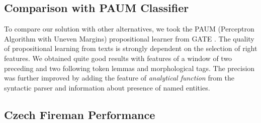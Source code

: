 \subsection{Comparison with PAUM Classifier}
To compare our solution with other alternatives, we took the PAUM (Perceptron Algorithm with Uneven Margins) propositional learner from GATE \citep{Li:Paum}. The quality of propositional learning from texts is strongly dependent on the selection of right features. We obtained quite good results with features of a window of two preceding and two following token lemmas and morphological tags. The precision was further improved by adding the feature of \emph{analytical function} from the syntactic parser and information about presence of named entities.




\subsection{Czech Fireman Performance}

